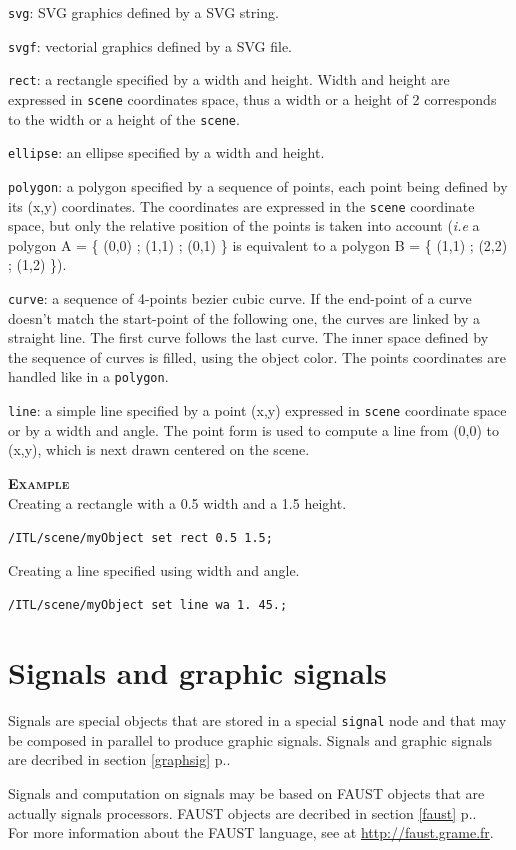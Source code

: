 \documentclass[a4paper,twoside]{report}
\newcommand{\sublevel}[1]	{\section{#1}}
\newcommand{\fullref}[1]	{\ref{#1} p.\pageref{#1}}
\newcommand{\OSC}[1]		{\texttt{#1}}
\newcommand{\example}		{\textbf{\hspace{-1.5cm}\textbf{\textsc{Example }}}}
\let\olditemize\itemize
\let\oldenditemize\enditemize
\renewenvironment{itemize} 	{\olditemize \setlength{\itemsep}{1mm}}{\oldenditemize}
\newcommand{\sample}	[1]			{\vspace{-2mm}\begin{center}\colorbox{mygrey}{
								\begin{minipage}[t]{0.9\columnwidth} 
								{\small \texttt{#1}}
								\end{minipage}}\end{center}}
\begin{document}
\begin{itemize}
\item \OSC{svg}: SVG graphics defined by a SVG string.
\item \OSC{svgf}: vectorial graphics defined by a SVG file.
\item \OSC{rect}: a rectangle specified by a width and height. Width and height are expressed in \OSC{scene} coordinates space, thus a width or a height of 2 corresponds to the width or a height of the \OSC{scene}.
\item \OSC{ellipse}: an ellipse specified by a width and height.
\item \OSC{polygon}: a polygon specified by a sequence of points, each point being defined by its (x,y) coordinates. The coordinates are expressed in the \OSC{scene} coordinate space, but only the relative position of the points is taken into account (\emph{i.e} a polygon A = \{ (0,0) ; (1,1) ; (0,1) \} is equivalent to a polygon B = \{ (1,1) ; (2,2) ; (1,2) \}).
\item \OSC{curve}: a sequence of 4-points bezier cubic curve. If the end-point of a curve doesn't match the start-point of the following one, the curves are linked by a straight line. The first curve follows the last curve. The inner space defined by the sequence of curves is filled, using the object color. The points coordinates are handled like in a \OSC{polygon}.
\item \OSC{line}: a simple line specified by a point (x,y) expressed in \OSC{scene} coordinate space or by a width and angle. The point form is used to compute a line from (0,0) to (x,y), which is next drawn centered on the scene.
\end{itemize}

\example \\
Creating a rectangle with a 0.5 width and a 1.5 height.
\sample{/ITL/scene/myObject set rect 0.5 1.5;}
Creating a line specified using width and angle.
\sample{/ITL/scene/myObject set line wa 1. 45.;}


\sublevel{Signals and graphic signals}
\label{sigscore}

Signals are special objects that are stored in a special \OSC{signal} node and that may be composed in parallel to produce graphic signals. Signals and graphic signals are decribed in section \fullref{graphsig}.

Signals and computation on signals may be based on FAUST objects that are actually signals processors. FAUST objects are decribed in section \fullref{faust}. \\
For more information about the FAUST language, see at \url{http://faust.grame.fr}.
\end{document}
